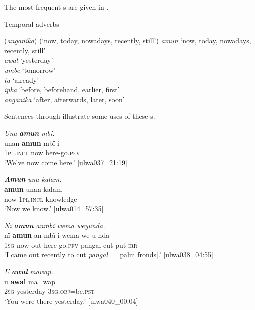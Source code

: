 
The most frequent s are given in .

\ea%
    \label{ex:otherwc:34}
          Temporal adverbs\\
\begin{tabbing}
{(\textit{anganika})} \= {(‘now, today, nowadays, recently, still’)}\kill
{\textit{amun}} \> {‘now, today, nowadays, recently, still’}\\
{\textit{awal}} \> {‘yesterday’}\\
{\textit{umbe}} \> {‘tomorrow’}\\
{\textit{ta}} \> {‘already’}\\
{\textit{ipka}} \> {‘before, beforehand, earlier, first’}\\
{\textit{anganika}} \> {‘after, afterwards, later, soon’}
\end{tabbing}
\z

Sentences  through  illustrate some uses of these s.

\ea%
    \label{ex:otherwc:35}
          \textit{Una} \textbf{\textit{amun}} \textit{mbi.}\\
\gll    unan    \textbf{amun}  mbï-i\\
    1\textsc{pl.incl}  now  here-go.\textsc{pfv}\\
\glt `We’ve now come here.’ [ulwa037\_21:19]
\z

\ea%
    \label{ex:otherwc:36}
          \textbf{\textit{Amun}} \textit{una kalam.}\\
\gll    \textbf{amun}  unan    kalam\\
    now  1\textsc{pl.incl}  knowledge\\
\glt `Now we know.’ [ulwa014\_57:35]
\z

\ea%
    \label{ex:otherwc:37}
          \textit{Nï} \textbf{\textit{amun}} \textit{anmbi wema weyunda.}\\
\gll    nï    \textbf{amun}  an-mbï-i      wema  we-u-nda\\
    1\textsc{sg}  now  out-here-go.\textsc{pfv}  pangal  cut-put-\textsc{irr}\\
\glt `I came out recently to cut \textit{pangal} [= palm fronds].’ [ulwa038\_04:55]
\z

\ea%
    \label{ex:otherwc:38}
          \textit{U} \textbf{\textit{awal}} \textit{mawap.}\\
\gll    u    \textbf{awal}    ma=wap\\
    2\textsc{sg}  yesterday  3\textsc{sg.obj}=be.\textsc{pst}\\
\glt `You were there yesterday.’ [ulwa040\_00:04]
\z

